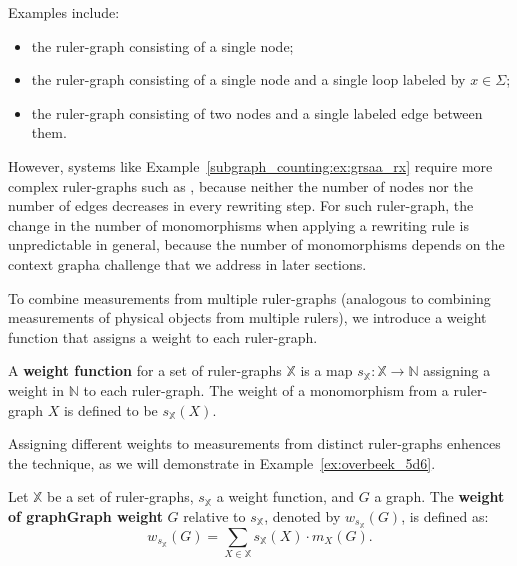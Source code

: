 Examples include: 
\begin{itemize}
    \item  the ruler-graph  consisting of a single node;
    \item the ruler-graph  consisting of a single node and a single loop labeled by $x\in \Sigma$; 
    \item the ruler-graph  consisting of two nodes and a single labeled edge between them.  
\end{itemize}
    
However, systems like Example~\ref{subgraph_counting:ex:grsaa_rx} require more complex ruler-graphs such as ,
    because neither the number of nodes nor the number of edges decreases in every rewriting step.
    For such ruler-graph, the change in the number of monomorphisms when applying a rewriting rule is unpredictable in general, because the number of monomorphisms 
    depends on the context graph\textemdash a challenge that we address in later sections.
    
To combine measurements from multiple ruler-graphs (analogous to combining measurements of physical objects from multiple rulers), we introduce a weight function that assigns a weight to each ruler-graph.
\begin{definition} 
    \label{subgraph_counting:def:weight_function}
    A \textbf{weight function} for a set of ruler-graphs \( \mathbb{X} \) is a map \( s_{\mathbb{X}} \mathop{\colon} \mathbb{X} \mathop{\to} \mathbb{N} \) assigning a weight in $\mathbb{N}$ to each ruler-graph. The weight of a monomorphism from a ruler-graph $X$ is defined to be $s_\mathbb{X}(X)$. 
\end{definition}
Assigning different weights to measurements from distinct ruler-graphs enhences the technique, as we will demonstrate in Example~\ref{ex:overbeek_5d6}.
\begin{definition} 
    \label{subgraph_counting:def:graph_weight}  
    Let \( \mathbb{X} \) be a set of ruler-graphs, 
    \( s_{\mathbb{X}} \) a weight function, and \( G \) a graph. The \textbf{weight of graph}\textbf{Graph weight} \( G \) relative to \( s_{\mathbb{X}} \), denoted by \( w_{s_{\mathbb{X}}}(G) \), is defined as: 
    \[
        w_{s_{\mathbb{X}}}(G) \mathop{=} \sum_{X \mathop{\in} \mathbb{X}} s_{\mathbb{X}}(X) \cdot m_X(G).  
    \]  
\end{definition} 

